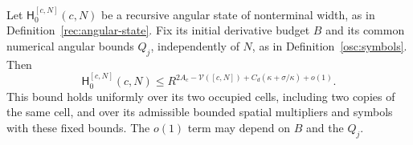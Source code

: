 \begin{theorem}\label{ledger:bound}
Let \(\mathsf H_0^{[c,N]}(c,N)\) be a recursive angular state of
nonterminal width, as in Definition~\ref{rec:angular-state}.
Fix its initial derivative budget \(B\) and its common numerical angular
bounds \(Q_j\), independently of \(N\), as in
Definition~\ref{osc:symbols}.
Then
\begin{equation}\label{ledger:bound-equation}
 \mathsf H_0^{[c,N]}(c,N)
 \le R^{2A_c-\mathcal V([c,N])
                   +C_d(\kappa+\sigma/\kappa)+o(1)}.
\end{equation}
This bound holds uniformly over its two occupied cells, including
two copies of the same cell, and over its admissible bounded
spatial multipliers and symbols with these fixed bounds.  The \(o(1)\)
term may depend on \(B\) and the \(Q_j\).
\end{theorem}

